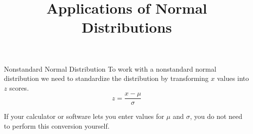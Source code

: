 \documentclass{beamer}
\title[MA205 - Section 6.2]{Applications of Normal Distributions}
\begin{document}
\begin{frame}
\titlepage
\end{frame}

\begin{frame}
\begin{block}{Nonstandard Normal Distribution}
To work with a nonstandard normal distribution we need to standardize the distribution by transforming $x$ values into $z$ scores.
\begin{equation*}
z=\dfrac{x-\mu}{\sigma}
\end{equation*}
\end{block}\pause

\begin{note}
If your calculator or software lets you enter values for $\mu$ and $\sigma$, you do not need to perform this conversion yourself.
\end{note}
\end{frame}
\end{document}
